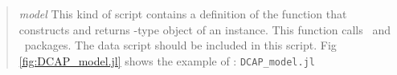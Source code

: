 %
%		
%	

\begin{quote}
\noindent\textit{model} This kind of script contains a definition of the function that constructs and returns \jumpmodel-type object of an instance. This function calls \jump\ and \structjump\ packages. The data script should be included in this script. Fig \ref{fig:DCAP_model.jl} shows the example of \dcap: \texttt{DCAP\_model.jl}
\end{quote}

